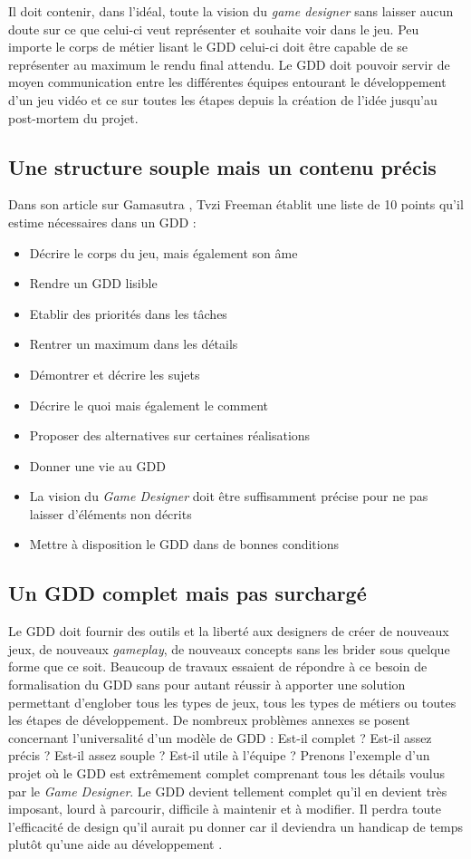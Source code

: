 Il doit contenir, dans l'idéal, toute la vision du \emph{game designer} sans laisser aucun doute sur ce que celui-ci veut représenter et souhaite voir dans le jeu. Peu importe le corps de métier lisant le GDD celui-ci doit être capable de se représenter au maximum le rendu final attendu. Le GDD doit pouvoir servir de moyen communication entre les différentes équipes entourant le développement d'un jeu vidéo et ce sur toutes les étapes depuis la création de l'idée jusqu'au post-mortem du projet.

\subsection{Une structure souple mais un contenu précis}
Dans son article sur Gamasutra \cite{gama_greateGDD}, Tvzi Freeman établit une liste de 10 points qu'il estime nécessaires dans un GDD :
\begin{itemize}
    \item Décrire le corps du jeu, mais également son âme
    \item Rendre un GDD lisible
    \item Etablir des priorités dans les tâches
    \item Rentrer un maximum dans les détails
    \item Démontrer et décrire les sujets
    \item Décrire le \guillemotleft quoi \guillemotright mais également le \guillemotleft comment \guillemotright
    \item Proposer des alternatives sur certaines réalisations
    \item Donner une vie au GDD
    \item La vision du  \emph{Game Designer} doit être suffisamment précise pour ne pas laisser d'éléments non décrits
    \item Mettre à disposition le GDD dans de bonnes conditions
\end{itemize}

\subsection{Un GDD complet mais pas surchargé}
Le GDD doit fournir des outils et la liberté aux designers de créer de nouveaux jeux, de nouveaux \emph{gameplay}, de nouveaux concepts sans les brider sous quelque forme que ce soit. Beaucoup de travaux essaient de répondre à ce besoin de formalisation du GDD \cite{GDD_software} \cite{multiview} \cite{GDD_GDProject} \cite{gama_greateGDD} sans pour autant réussir à apporter une solution permettant d'englober tous les types de jeux, tous les types de métiers ou toutes les étapes de développement. De nombreux problèmes annexes se posent concernant l'universalité d'un modèle de GDD : Est-il complet ? Est-il assez précis ? Est-il assez souple ? Est-il utile à l'équipe ? Prenons l'exemple d'un projet où le GDD est extrêmement complet comprenant tous les détails voulus par le \emph{Game Designer}. Le GDD devient tellement complet qu'il en devient très imposant, lourd à parcourir, difficile à maintenir et à modifier. Il perdra toute l'efficacité de design qu'il aurait pu donner car il deviendra un handicap de temps plutôt qu'une aide au développement \cite{onepage_librande}.

